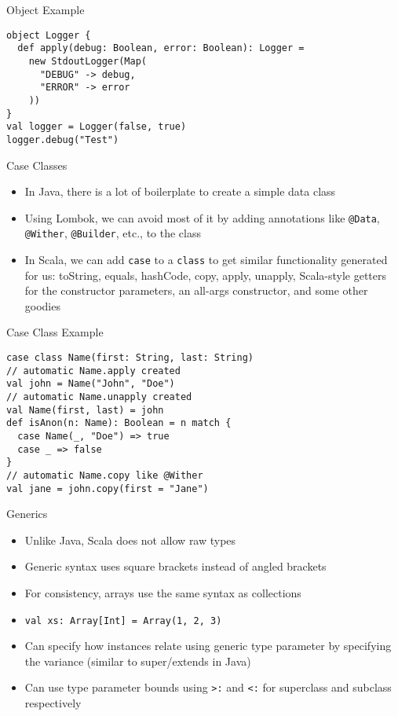 \documentclass{beamer}
\begin{document}
\begin{frame}[fragile]{Object Example}
\begin{lstlisting}
object Logger {
  def apply(debug: Boolean, error: Boolean): Logger =
    new StdoutLogger(Map(
      "DEBUG" -> debug,
      "ERROR" -> error
    ))
}
val logger = Logger(false, true)
logger.debug("Test")
\end{lstlisting}
\end{frame}

\begin{frame}{Case Classes}
\begin{itemize}
\item In Java, there is a lot of boilerplate to create a simple data class
\item Using Lombok, we can avoid most of it by adding annotations like
\lstinline{@Data}, \lstinline{@Wither}, \lstinline{@Builder}, etc., to the class
\item In Scala, we can add \lstinline{case} to a \lstinline{class} to get
similar functionality generated for us: toString, equals, hashCode, copy,
apply, unapply, Scala-style getters for the constructor parameters, an all-args
constructor, and some other goodies
\end{itemize}
\end{frame}

\begin{frame}[fragile]{Case Class Example}
\begin{lstlisting}
case class Name(first: String, last: String)
// automatic Name.apply created
val john = Name("John", "Doe")
// automatic Name.unapply created
val Name(first, last) = john
def isAnon(n: Name): Boolean = n match {
  case Name(_, "Doe") => true
  case _ => false
}
// automatic Name.copy like @Wither
val jane = john.copy(first = "Jane")
\end{lstlisting}
\end{frame}

\begin{frame}{Generics}
\begin{itemize}
\item Unlike Java, Scala does not allow raw types
\item Generic syntax uses square brackets instead of angled brackets
\item For consistency, arrays use the same syntax as collections
\item \lstinline{val xs: Array[Int] = Array(1, 2, 3)}
\item Can specify how instances relate using generic type parameter by
specifying the variance (similar to super/extends in Java)
\item Can use type parameter bounds using \lstinline{>:} and \lstinline{<:}
for superclass and subclass respectively
\end{itemize}
\end{frame}
\end{document}
